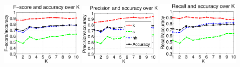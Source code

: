 	\centering\includegraphics[width=0.3\textwidth]{tex/appendices/test/zcr11FP.png}
	\centering\includegraphics[width=0.3\textwidth]{tex/appendices/test/zcr11_P.png}
	\centering\includegraphics[width=0.3\textwidth]{tex/appendices/test/zcr11_R.png}


